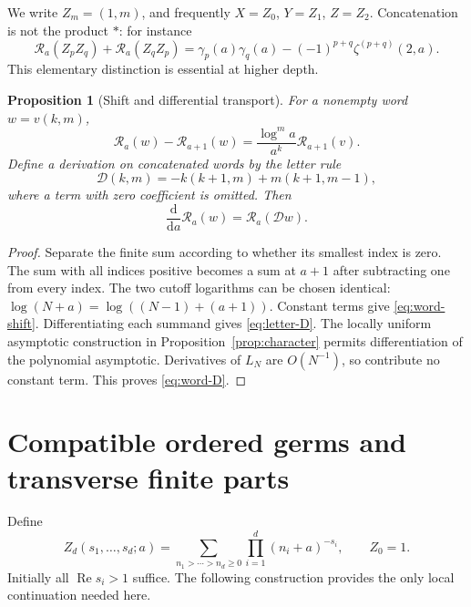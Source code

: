\documentclass[11pt]{article}
\numberwithin{equation}{section}
\newtheorem{proposition}[theorem]{Proposition}
\theoremstyle{definition}
\newcommand{\R}{\mathcal R}
\newcommand{\Ree}{\operatorname{Re}}
\begin{document}
We write $Z_m=(1,m)$, and frequently $X=Z_0$, $Y=Z_1$, $Z=Z_2$.
Concatenation is not the product $*$: for instance
\begin{equation}\label{eq:double-stuffle}
 \R_a(Z_pZ_q)+\R_a(Z_qZ_p)
 =\gamma_p(a)\gamma_q(a)-(-1)^{p+q}\zeta^{(p+q)}(2,a).
\end{equation}
This elementary distinction is essential at higher depth.

\begin{proposition}[Shift and differential transport]\label{prop:transport}
For a nonempty word $w=v(k,m)$,
\begin{equation}\label{eq:word-shift}
 \R_a(w)-\R_{a+1}(w)=\frac{\log^m a}{a^k}\R_{a+1}(v).
\end{equation}
Define a derivation on concatenated words by the letter rule
\begin{equation}\label{eq:letter-D}
 \mathcal D(k,m)=-k(k+1,m)+m(k+1,m-1),
\end{equation}
where a term with zero coefficient is omitted. Then
\begin{equation}\label{eq:word-D}
 \frac{\mathrm d}{\mathrm da}\R_a(w)=\R_a(\mathcal Dw).
\end{equation}
\end{proposition}
\begin{proof}
Separate the finite sum according to whether its smallest index is zero.
The sum with all indices positive becomes a sum at $a+1$ after subtracting
one from every index. The two cutoff logarithms can be chosen identical:
$\log(N+a)=\log((N-1)+(a+1))$. Constant terms give
\eqref{eq:word-shift}. Differentiating each summand gives
\eqref{eq:letter-D}. The locally uniform asymptotic construction in
Proposition~\ref{prop:character} permits differentiation of the polynomial
asymptotic. Derivatives of $L_N$ are $O(N^{-1})$, so contribute no constant
term. This proves \eqref{eq:word-D}.
\end{proof}

\section{Compatible ordered germs and transverse finite parts}
\label{sec:germs}
Define
\[
 Z_d(s_1,\ldots,s_d;a)=\sum_{n_1>\cdots>n_d\ge0}
                         \prod_{i=1}^d(n_i+a)^{-s_i},\qquad Z_0=1.
\]
Initially all $\Ree s_i>1$ suffice. The following construction provides
the only local continuation needed here.
\end{document}

